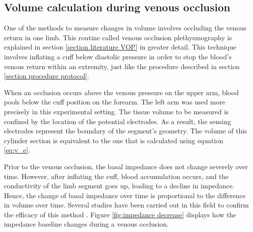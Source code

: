 \subsection{Volume calculation during venous occlusion}
\label{section procedure volume vop}
One of the methods to measure changes in volume involves occluding the venous return in one limb. This routine called venous occlusion plethysmography is explained in section \ref{section literature VOP} in greater detail. This technique involves inflating a cuff below diastolic pressure in order to stop the blood's venous return within an extremity, just like the procedure described in section \ref{section procedure protocol}. 

When an occlusion occurs above the venous pressure on the upper arm, blood pools below the cuff position on the forearm. The left arm was used more precisely in this experimental setting. The tissue volume to be measured is confined by the location of the potential electrodes. As a result, the sensing electrodes represent the boundary of the segment's geometry. The volume of this cylinder section is equivalent to the one that is calculated using equation \ref{eq:v_e}. 

Prior to the venous occlusion, the basal impedance does not change severely over time. However, after inflating the cuff, blood accumulation occurs, and the conductivity of the limb segment goes up, leading to a decline in impedance. Hence, the change of basal impedance over time is proportional to the difference in volume over time. Several studies have been carried out in this field to confirm the efficacy of this method \cite{costeloe1980continuous,anderson1984impedance, mohapatra1981non, golden1986assessment}. Figure \ref{fig:impedance decrease} displays how the impedance baseline changes during a venous occlusion. 

